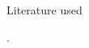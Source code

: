 %
%
%
%



\begin{frame}[allowframebreaks]{Literature used}
 
  
 .

  \nocite{*}

  {\tiny 
%  
    \printbibliography %
  }

\end{frame}